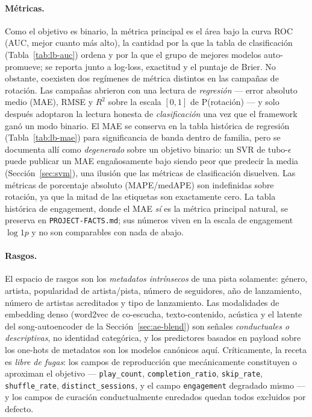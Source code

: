 \documentclass[11pt]{article}
\newcommand{\medape}{medAPE}
\newcommand{\rsq}{$R^2$}
\begin{document}
\paragraph{Métricas.} Como el objetivo es binario, la métrica principal es el
área bajo la curva ROC (AUC, mejor cuanto más alto), la cantidad por la que la
tabla de clasificación (Tabla~\ref{tab:lb-auc}) ordena y por la que el grupo de
mejores modelos auto-promueve; se reporta junto a log-loss, exactitud y el
puntaje de Brier. No obstante, coexisten dos regímenes de métrica distintos en
las campañas de rotación. Las campañas abrieron con una lectura de
\emph{regresión} --- error absoluto medio (MAE), RMSE y \rsq{} sobre la escala
$[0,1]$ de P(rotación) --- y solo después adoptaron la lectura honesta de
\emph{clasificación} una vez que el framework ganó un modo binario. El MAE se
conserva en la tabla histórica de regresión (Tabla~\ref{tab:lb-mae}) para
significancia de banda dentro de familia, pero se documenta allí como
\emph{degenerado} sobre un objetivo binario: un SVR de tubo-$\epsilon$ puede
publicar un MAE engañosamente bajo siendo peor que predecir la media
(Sección~\ref{sec:svm}), una ilusión que las métricas de clasificación
disuelven. Las métricas de porcentaje absoluto (MAPE/\medape{}) son
indefinidas sobre rotación, ya que la mitad de las etiquetas son exactamente
cero. La tabla histórica de engagement, donde el MAE \emph{sí} es la métrica
principal natural, se preserva en \texttt{PROJECT-FACTS.md}; sus números viven
en la escala de engagement $\log1p$ y no son comparables con nada de abajo.

\paragraph{Rasgos.} El espacio de rasgos son los \emph{metadatos intrínsecos} de
una pista solamente: género, artista, popularidad de artista/pista, número de
seguidores, año de lanzamiento, número de artistas acreditados y tipo de
lanzamiento. Las modalidades de embedding denso (word2vec de co-escucha,
texto-contenido, acústica y el latente del song-autoencoder de la
Sección~\ref{sec:ae-blend}) son señales \emph{conductuales o descriptivas}, no
identidad categórica, y los predictores basados en payload sobre los one-hots de
metadatos son los modelos canónicos aquí. Críticamente, la receta es \emph{libre
de fugas}: los campos de reproducción que mecánicamente constituyen o aproximan
el objetivo --- \texttt{play\_count}, \texttt{completion\_ratio},
\texttt{skip\_rate}, \texttt{shuffle\_rate}, \texttt{distinct\_sessions}, y el
campo \texttt{engagement} degradado mismo --- y los campos de curación
conductualmente enredados quedan todos excluidos por defecto.
\end{document}
